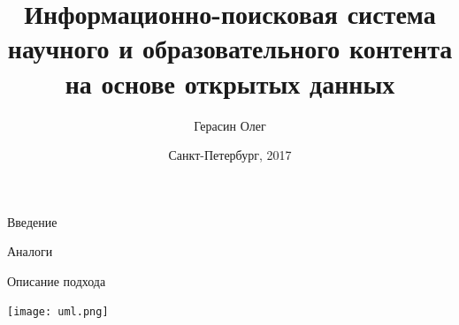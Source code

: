 \documentclass{beamer}
\begin{document}
	\title[XLVI Конференция Университета ИТМО]{Информационно-поисковая система\\ научного и образовательного контента\\ на основе открытых данных}  
	\author[Герасин О.В.]{Герасин Олег}
	\date{Санкт-Петербург, 2017} 
	\frame{\titlepage} 
	\begin{frame}{Введение}
	\end{frame}

	\begin{frame}{Аналоги}
		
	\end{frame}	
	
	\begin{frame}{Описание подхода}
		 \begin{center}
		 	\texttt{[image: uml.png]}  
		 \end{center}
	\end{frame}	
	
\end{document}
